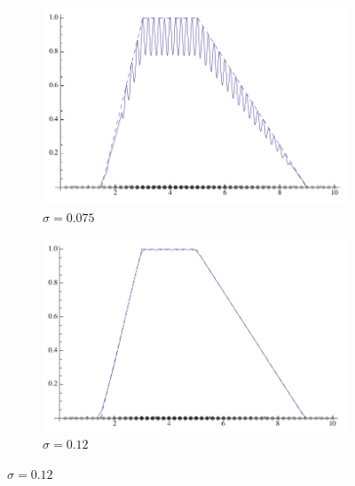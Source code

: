 \documentclass[a4paper,12pt]{report}
\begin{document}
\begin{itemize}
    \begin{figure}[h]
        \begin{subfigure}[t]{0.32\textwidth}
           \centering
           \includegraphics[scale=0.18]{images/parametro_sigma_1.png}
           \caption{$\sigma = 0.075 $}
           \label{fig:sigma_1}
    
        \end{subfigure}
        \begin{subfigure}[t]{0.32\textwidth}
            \centering
            \includegraphics[scale=0.18]{images/parametro_sigma_2.png} 
            \caption{$\sigma = 0.12 $}
            \label{fig:sigma_2}
    

\end{subfigure}
\end{figure}
\end{itemize}
\end{document}
